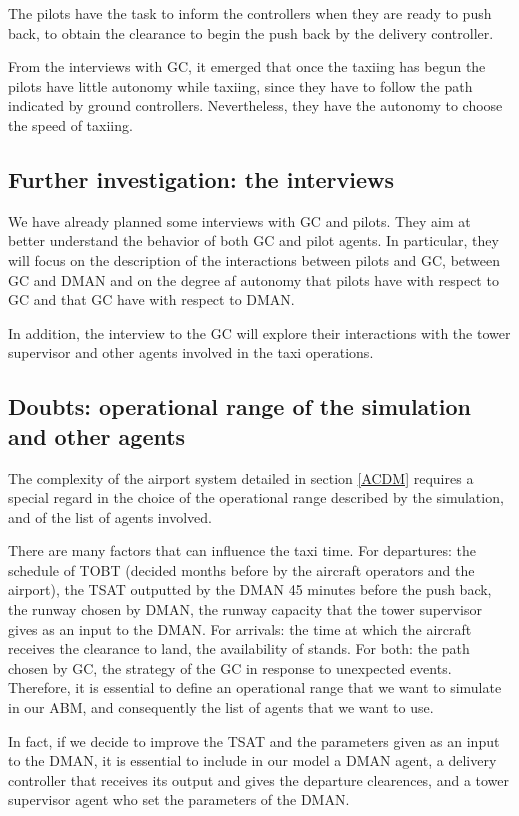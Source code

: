 \documentclass{article}
\begin{document}
The pilots have the task to inform the controllers when they are ready to push back, to obtain the clearance to begin the push back by the delivery controller.

From the interviews with GC, it emerged that once the taxiing has begun the pilots have little autonomy while taxiing, since they have to follow the path indicated by ground controllers.
Nevertheless, they have the autonomy to choose the speed of taxiing.

\subsection{Further investigation: the interviews}
We have already planned some interviews with GC and pilots. 
They aim at better understand the behavior of both GC and pilot agents. In particular, they will focus on the description of the interactions between pilots and GC, between GC and DMAN and on the degree af autonomy that pilots have with respect to GC and that GC have with respect to DMAN. 

In addition, the interview to the GC will explore their interactions with the tower supervisor and other agents involved in the taxi operations.

\subsection{Doubts: operational range of the simulation and other agents}\label{other-agents}
The complexity of the airport system detailed in section \ref{ACDM} requires a special regard in the choice of the operational range described by the simulation, and of the list of agents involved.

There are many factors that can influence the taxi time. For departures: the schedule of TOBT (decided months before by the aircraft operators and the airport), the TSAT outputted by the DMAN 45 minutes before the push back, the runway chosen by DMAN, the runway capacity that the tower supervisor gives as an input to the DMAN. For arrivals: the time at which the aircraft receives the clearance to land, the availability of stands. For both: the path chosen by GC, the strategy of the GC in response to unexpected events.
Therefore, it is essential to define an operational range that we want to simulate in our ABM, and consequently the list of agents that we want to use. 

In fact, if we decide to improve the TSAT and the parameters given as an input to the DMAN, it is essential to include in our model a DMAN agent, a delivery controller that receives its output and gives the departure clearences, and a tower supervisor agent who set the parameters of the DMAN.
\end{document}
